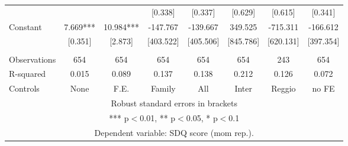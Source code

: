 \begin{tabular}{lccccccc}
 &  &  & [0.338] & [0.337] & [0.629] & [0.615] & [0.341] \\
Constant & 7.669*** & 10.984*** & -147.767 & -139.667 & 349.525 & -715.311 & -166.612 \\
 & [0.351] & [2.873] & [403.522] & [405.506] & [845.786] & [620.131] & [397.354] \\
 &  &  &  &  &  &  &  \\
Observations & 654 & 654 & 654 & 654 & 654 & 243 & 654 \\
R-squared & 0.015 & 0.089 & 0.137 & 0.138 & 0.212 & 0.126 & 0.072 \\
 Controls & None & F.E. & Family & All & Inter & Reggio & no FE \\ \hline
\multicolumn{8}{c}{ Robust standard errors in brackets} \\
\multicolumn{8}{c}{ *** p$<$0.01, ** p$<$0.05, * p$<$0.1} \\
\multicolumn{8}{c}{ Dependent variable: SDQ score (mom rep.).} \\
\end{tabular}
